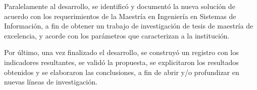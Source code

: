 \bigskip Paralelamente al desarrollo, se identificó y documentó la nueva solución de acuerdo con los requerimientos de la Maestría en Ingeniería en Sistemas de Información, a fin de obtener un trabajo de investigación de tesis de maestría de excelencia, y acorde con los parámetros que caracterizan a la institución.

\bigskip Por último, una vez finalizado el desarrollo, se construyó un registro con los indicadores resultantes, se validó la propuesta, se explicitaron los resultados obtenidos y se elaboraron las conclusiones, a fin de abrir y/o profundizar en nuevas líneas de investigación.
